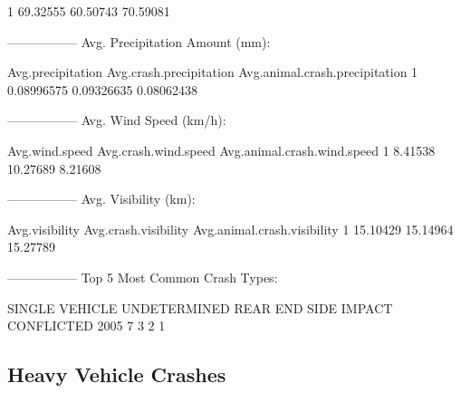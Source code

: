 \documentclass[11pt, a4paper]{article}
\begin{document}
\begin{Schunk}
\begin{Soutput}
1     69.32555           60.50743                  70.59081
\end{Soutput}
\begin{Soutput}
-----------------
Avg. Precipitation Amount (mm):
\end{Soutput}
\begin{Soutput}
  Avg.precipitation Avg.crash.precipitation Avg.animal.crash.precipitation
1        0.08996575              0.09326635                     0.08062438
\end{Soutput}
\begin{Soutput}
-----------------
Avg. Wind Speed (km/h):
\end{Soutput}
\begin{Soutput}
  Avg.wind.speed Avg.crash.wind.speed Avg.animal.crash.wind.speed
1        8.41538             10.27689                     8.21608
\end{Soutput}
\begin{Soutput}
-----------------
Avg. Visibility (km):
\end{Soutput}
\begin{Soutput}
  Avg.visibility Avg.crash.visibility Avg.animal.crash.visibility
1       15.10429             15.14964                    15.27789
\end{Soutput}
\begin{Soutput}
-----------------
Top 5 Most Common Crash Types:
\end{Soutput}
\begin{Soutput}
SINGLE VEHICLE   UNDETERMINED       REAR END    SIDE IMPACT     CONFLICTED 
          2005              7              3              2              1 
\end{Soutput}
\end{Schunk}



\pagebreak
\subsection{Heavy Vehicle Crashes}
\end{document}

